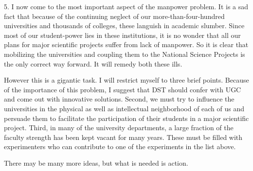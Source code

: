 5. I now come to the most important aspect of the
manpower problem. It is a sad fact that because of the
continuing neglect of our more-than-four-hundred universities
and thousands of colleges, these languish in academic
slumber. Since most of our student-power lies in these
institutions, it is no wonder that all our plans for
major scientific projects suffer from lack of manpower.
So it is clear that mobilizing the universities and
coupling them to the National Science Projects is the
only correct way forward. It will remedy both these ills.

However this is a gigantic task. I will restrict myself to 
three brief points. Because of the importance of this 
problem, I suggest that DST should confer with UGC and
come out with innovative solutions. Second, we must try to
influence the universities in the physical as well as
intellectual neighborhood of each of us and persuade them to
facilitate the participation of their students in a
major scientific project. Third, in many of the university
departments, a large fraction of the faculty strength has
been kept vacant for many years. These must be filled with
experimenters who can contribute to one of the experiments
in the list above.

There may be many more ideas, but what is needed is action.
